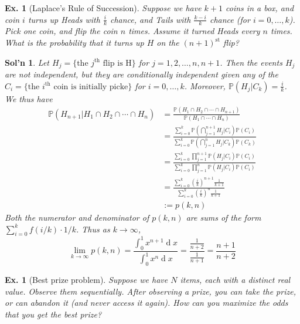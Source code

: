 \documentclass[12pt, a4paper]{book}
\renewcommand{\Pr}{\mathbb{P}}
\renewcommand{\d}[1]{\ensuremath{\operatorname{d}\!{#1}}} %
\newtheorem{example}[theorem]{Ex.}
\theoremstyle{nonumberplain}
\newtheorem{solution}{Sol'n}
\begin{document}
\begin{example}[Laplace's Rule of Succession]
    Suppose we have $k+1$ coins in a box, and coin $i$ turns up Heads with $\frac{i}{k}$ chance, and Tails with $\frac{k-i}{k}$ chance (for $i=0,\ldots,k$).
    Pick one coin, and flip the coin $n$ times.
    Assume it turned Heads every $n$ times.
    What is the probability that it turns up $H$ on the $(n+1)^\text{st}$ flip?
\end{example}
\begin{solution}
    Let $H_j=\{\text{the $j^\text{th}$ flip is H}\}$ for $j=1,2,\ldots,n,n+1$.
    Then the events $H_j$ are not independent, but they are conditionally independent given any of the $C_i=\{\text{the $i^\text{th}$ coin is initially picke}\}$ for $i=0,\ldots,k$.
    Moreover, $\Pr(H_j|C_k)=\frac{i}{k}$.
    We thus have
    \begin{align*}
        \Pr(H_{n+1}|H_1\cap H_2\cap\cdots\cap H_n) &= \frac{\Pr(H_1\cap H_2\cap\cdots\cap H_{n+1})}{\Pr(H_1\cap\cdots\cap H_n)}\\
                                                   &= \frac{\sum\limits_{i=0}^k\Pr\left(\bigcap_{j=1}^{n+1}H_j|C_i\right)\Pr(C_i)}{\sum\limits_{i=0}^k\Pr(\bigcap\limits_{j=1}^nH_j|C_k)\Pr(C_k)}\\
                                                   &= \frac{\sum\limits_{i=0}^k\prod\limits_{j=1}^{n+1}\Pr(H_j|C_i)\Pr(C_i)}{\sum\limits_{i=0}^k\prod\limits_{j=1}^n\Pr(H_j|C_i)\Pr(C_i)}\\
                                                   &= \frac{\sum\limits_{i=0}^k\left(\frac{i}{k}\right)^{n+1}\frac{1}{k+1}}{\sum\limits_{i=0}^k\left(\frac{i}{k}\right)^n\frac{1}{k+1}}\\
                                                   &:= p(k,n)
    \end{align*}
    Both the numerator and denominator of $p(k,n)$ are sums of the form $\sum\limits_{i=0}^k f(i/k)\cdot 1/k$.
    Thus as $k\to\infty$,
    \[\lim_{k\to\infty}p(k,n)=\frac{\int_0^1 x^{n+1}\d{x}}{\int_0^1 x^n\d{x}}=\frac{\frac{1}{n+2}}{\frac{1}{n+1}}=\frac{n+1}{n+2}\]
\end{solution}
\begin{example}[Best prize problem]
    Suppose we have $N$ items, each with a distinct real value.
    Observe them sequentially.
    After observing a prize, you can take the prize, or can abandon it (and never access it again).
    How can you maximize the odds that you get the best prize?
\end{example}
\end{document}

